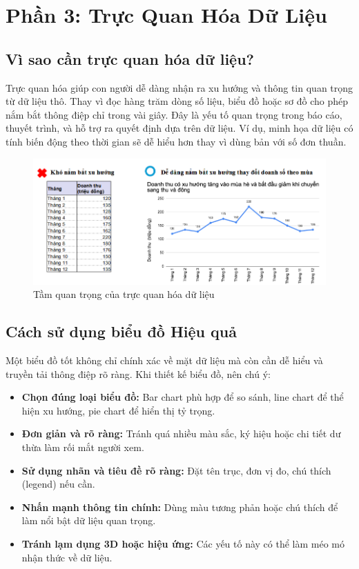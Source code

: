 \documentclass[11pt]{article}
\begin{document}
\section{Phần 3: Trực Quan Hóa Dữ Liệu}

\subsection{Vì sao cần trực quan hóa dữ liệu?}
Trực quan hóa giúp con người dễ dàng nhận ra xu hướng và thông tin quan trọng từ dữ liệu thô. Thay vì đọc hàng trăm dòng số liệu, biểu đồ hoặc sơ đồ cho phép nắm bắt thông điệp chỉ trong vài giây. Đây là yếu tố quan trọng trong báo cáo, thuyết trình, và hỗ trợ ra quyết định dựa trên dữ liệu. Ví dụ, minh họa dữ liệu có tính biến động theo thời gian sẽ dễ hiểu hơn thay vì dùng bản với số đơn thuần.

\begin{figure}[H]
    \centering
    \includegraphics[width=0.7\linewidth]{images/why_dataVisualization.png}
    \caption{Tầm quan trọng của trực quan hóa dữ liệu}
    \label{fig:why DA}
\end{figure}

\subsection{Cách sử dụng biểu đồ Hiệu quả}
Một biểu đồ tốt không chỉ chính xác về mặt dữ liệu mà còn cần dễ hiểu và truyền tải thông điệp rõ ràng. Khi thiết kế biểu đồ, nên chú ý:
\begin{itemize}
    \item \textbf{Chọn đúng loại biểu đồ:} Bar chart phù hợp để so sánh, line chart để thể hiện xu hướng, pie chart để hiển thị tỷ trọng.
    \item \textbf{Đơn giản và rõ ràng:} Tránh quá nhiều màu sắc, ký hiệu hoặc chi tiết dư thừa làm rối mắt người xem.
    \item \textbf{Sử dụng nhãn và tiêu đề rõ ràng:} Đặt tên trục, đơn vị đo, chú thích (legend) nếu cần.
    \item \textbf{Nhấn mạnh thông tin chính:} Dùng màu tương phản hoặc chú thích để làm nổi bật dữ liệu quan trọng.
    \item \textbf{Tránh lạm dụng 3D hoặc hiệu ứng:} Các yếu tố này có thể làm méo mó nhận thức về dữ liệu.
\end{itemize}
\end{document}
